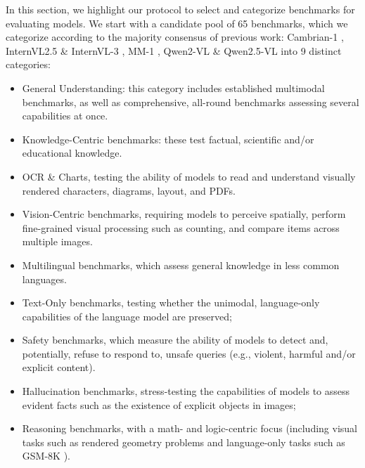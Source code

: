 In this section, we highlight our protocol to select and categorize benchmarks for evaluating models. 
We start with a candidate pool of 65 benchmarks, which we categorize according to the majority consensus of previous work: Cambrian-1 \cite{tong2024cambrian}, InternVL2.5 \& InternVL-3 \cite{chen2024expanding, zhu2025internvl3}, MM-1 \cite{mckinzie2024mm1}, Qwen2-VL \& Qwen2.5-VL \cite{wang2024qwen2, bai2025qwen25vltechnicalreport} into 9 distinct categories:
\begin{itemize}[leftmargin=*,itemsep=1pt]
    \item General Understanding: this category includes established multimodal benchmarks, as well as comprehensive, all-round benchmarks assessing several capabilities at once. 
    \item Knowledge-Centric benchmarks: these test factual, scientific and/or educational knowledge. 
    \item OCR \& Charts, testing the ability of models to read and understand visually rendered characters, diagrams, layout, and PDFs. 
    \item Vision-Centric benchmarks, requiring models to perceive spatially, perform fine-grained visual processing such as counting, and compare items across multiple images. 
    \item Multilingual benchmarks, which assess general knowledge in less common languages. 
    \item Text-Only benchmarks, testing whether the unimodal, language-only capabilities of the language model are preserved; 
    \item Safety benchmarks, which measure the ability of models to detect and, potentially, refuse to respond to, unsafe queries (e.g., violent, harmful and/or explicit content). 
    \item Hallucination benchmarks, stress-testing the capabilities of models to assess evident facts such as the existence of explicit objects in images; 
    \item Reasoning benchmarks, with a math- and logic-centric focus (including visual tasks such as rendered geometry problems and language-only tasks such as GSM-8K \cite{cobbe2021gsm8k}). 
\end{itemize}

